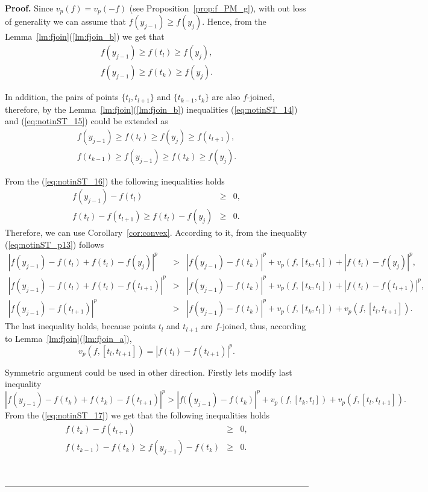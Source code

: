 \documentclass[12pt, a4paper]{article}
\newenvironment{proof}[1][Proof]{\noindent \textbf{#1.} }{\  \rule{0.5em}{0.5em}}
\numberwithin{equation}{section}
\begin{document}
\begin{proof}
  Since $v_p(f)=v_p(-f)$ (see Proposition~\ref{prop:f_PM_g}), 
  with out loss of generality we can assume that
  $f(y_{j-1}) \geq f(y_j)$. 
  Hence, from the Lemma~\ref{lm:fjoin}(\ref{lm:fjoin_b}) 
  we get that
  \begin{eqnarray}
    f(y_{j-1}) \geq f(t_{l}) \geq f(y_j), \label{eq:notinST_14}  \\
    f(y_{j-1}) \geq f(t_{k}) \geq f(y_j). \label{eq:notinST_15}
  \end{eqnarray}  

  In addition, the pairs of points $\{t_l,t_{l+1}\}$ 
  and $\{t_{k-1},t_{k}\}$ are also $f$-joined, therefore,
  by the Lemma~\ref{lm:fjoin}(\ref{lm:fjoin_b})
  inequalities (\ref{eq:notinST_14}) and (\ref{eq:notinST_15})
  could be extended as
  \begin{eqnarray}
    \label{eq:notinST_16} 
    f(y_{j-1}) \geq f(t_{l}) \geq f(y_j) \geq f(t_{l+1}),  \\
    \label{eq:notinST_17}
    f(t_{k-1}) \geq f(y_{j-1}) \geq f(t_{k}) \geq f(y_j). 
  \end{eqnarray}         
    
  
  From the (\ref{eq:notinST_16}) the following inequalities holds
  \begin{eqnarray*}
    f(y_{j-1})-f(t_l) &\geq& 0, \\
    f(t_{l})-f(t_{l+1}) \geq f(t_l)-f(y_j) & \geq & 0.
  \end{eqnarray*} 
  Therefore, we can use Corollary~\ref{cor:convex}. According to it,
  from the inequality (\ref{eq:notinST_p13}) follows  
  \begin{eqnarray*}
    |f(y_{j-1})-f(t_l)+f(t_l)-f(y_j)|^p &>& |f(y_{j-1})-f(t_{k})|^p +
       v_p(f,[t_k,t_l]) +  |f(t_{l})-f(y_j)|^p, \\  
    |f(y_{j-1})-f(t_l)+f(t_l)-f(t_{l+1})|^p &>&|f(y_{j-1})-f(t_{k})|^p
      + v_p(f,[t_k,t_l]) +  |f(t_{l})-f(t_{l+1})|^p, \\
    |f(y_{j-1})-f(t_{l+1})|^p &>& |f(y_{j-1})-f(t_{k})|^p 
      + v_p(f,[t_k,t_l]) +  v_p(f,[t_l,t_{l+1}]). 
  \end{eqnarray*}    
  The last inequality holds,
  because points $t_{l}$ and $t_{l+1}$ are $f$-joined,
  thus, according to Lemma~\ref{lm:fjoin}(\ref{lm:fjoin_a}),
  \begin{equation*}\label{eq:notinST_18}
    v_p(f,[t_l,t_{l+1}]) = |f(t_{l})-f(t_{l+1})|^p.
  \end{equation*}   


  
  Symmetric argument could be used in other direction. 
  Firstly lets modify last inequality
  \begin{equation*}\label{eq:notinST_19}
    |f(y_{j-1})-f(t_k)+f(t_k)-f(t_{l+1})|^p > |f((y_{j-1})-f(t_{k})|^p 
      + v_p(f,[t_k,t_l]) +  v_p(f,[t_l,t_{l+1}]). 
  \end{equation*}   
  From the (\ref{eq:notinST_17}) we get that
   the following inequalities holds
  \begin{eqnarray*}
    f(t_k)-f(t_{l+1}) & \geq & 0, \\
    f(t_{k-1})-f(t_{k}) \geq f(y_{j-1})-f(t_k) & \geq & 0.
  \end{eqnarray*} 


\end{proof}
\end{document}
